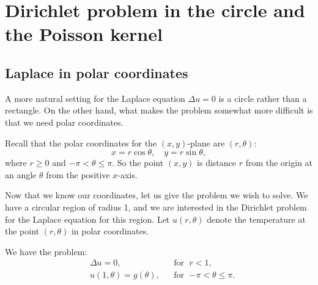 
\sectionnewpage
\section{Dirichlet problem in the circle and the Poisson kernel}
\label{dirichdisc:section}


\subsection{Laplace in polar coordinates}

A more natural setting for the Laplace equation $\Delta u = 0$
is a circle rather than a rectangle.  On the other hand, what makes the
problem somewhat more difficult is that we need polar coordinates.

\begin{mywrapfigsimp}{1.3in}{1.5in}
\diffypdfversion{\vspace*{5pt}}
\noindent
{}
\diffypdfversion{\vspace*{5pt}}
\end{mywrapfigsimp}
Recall that the polar coordinates for the $(x,y)$-plane are $(r,\theta)$: 
\begin{equation*}
x = r \cos \theta , \quad y = r \sin \theta ,
\end{equation*}
where $r \geq 0$ and $-\pi < \theta \leq \pi$.  So the point $(x,y)$ is
distance $r$ from the origin at an angle $\theta$ from the positive
$x$-axis.

Now that we know our coordinates, let us give the problem we wish
to solve.  We have a circular region of radius 1, and we are interested
in the Dirichlet problem for the Laplace equation for this region.  Let
$u(r,\theta)$ denote the temperature at the point $(r,\theta)$ in polar
coordinates.

\begin{mywrapfigsimp}{2.4in}{2.7in}
\noindent
{}
\end{mywrapfigsimp}
We have the problem:
\begin{equation} \label{dirichdisc:theprobeq}
\begin{aligned}
& \Delta u = 0 , & & \text{for } \; r < 1, \\
& u(1,\theta) = g(\theta), & & \text{for } \; {-\pi} < \theta \leq \pi.
\end{aligned}
\end{equation}

